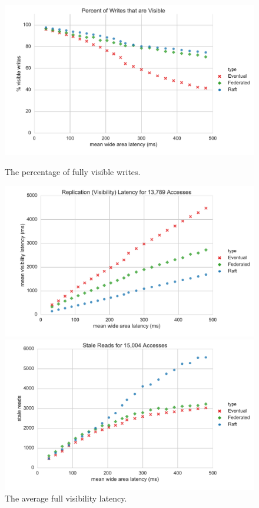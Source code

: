 \documentclass[10pt,conference,letterpaper]{IEEEtran}
\begin{document}
\begin{figure}[t]
    \centering
      \includegraphics[width=\linewidth]{figures/latency/percent_visible_writes}
      \caption{The percentage of fully visible writes.}\label{fig:visible_writes}
    \endminipage\hfill
      \includegraphics[width=\linewidth]{figures/latency/visibility_latency}
      \caption{The average full visibility latency.}\label{fig:visibility_latency}
    \endminipage\hfill
      \includegraphics[width=\linewidth]{figures/latency/stale_reads}

\end{figure}
\end{document}

